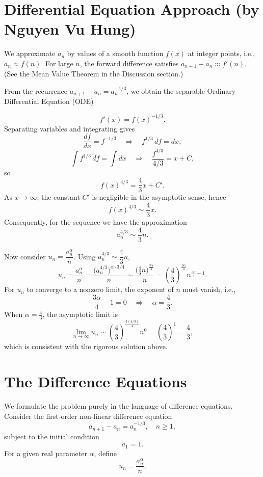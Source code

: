 \documentclass{article}
\begin{document}
\section{Differential Equation Approach (by Nguyen Vu Hung)}
We approximate $a_n$ by values of a smooth function $f(x)$ at 
integer points, i.e., $a_n \approx f(n)$. 
For large $n$, the forward difference satisfies $a_{n+1} - a_n \approx f'(n)$.
(See the Mean Value Theorem in the Discussion section.)


From the recurrence $a_{n+1} - a_n = a_n^{-1/3}$, we obtain the separable Ordinary Differential Equation (ODE)

$$ f'(x) = f(x)^{-1/3}. $$
Separating variables and integrating gives
$$ \frac{df}{dx} = f^{-1/3} \quad \Rightarrow \quad f^{1/3}\, df = dx, $$
$$ \int f^{1/3}\, df = \int dx \quad \Rightarrow \quad \frac{f^{4/3}}{4/3} = x + C, $$
so
$$ f(x)^{4/3} = \frac{4}{3}x + C'. $$
As $x \to \infty$, the constant $C'$ is negligible in the asymptotic sense, hence
$$ f(x)^{4/3} \sim \frac{4}{3}x. $$
Consequently, for the sequence we have the approximation
$$ a_n^{4/3} \sim \frac{4}{3}n. $$

Now consider $u_n = \dfrac{a_n^{\alpha}}{n}$. Using $a_n^{4/3} \sim \dfrac{4}{3}n$,
$$ u_n = \frac{a_n^{\alpha}}{n} = \frac{\big(a_n^{4/3}\big)^{\alpha\cdot 3/4}}{n}
\sim \frac{\big(\tfrac{4}{3}n\big)^{\frac{3\alpha}{4}}}{n}
= \left(\frac{4}{3}\right)^{\frac{3\alpha}{4}} n^{\frac{3\alpha}{4}-1}. $$
For $u_n$ to converge to a nonzero limit, the exponent of $n$ must vanish, i.e.,
$$ \frac{3\alpha}{4} - 1 = 0 \quad \Longrightarrow \quad \alpha = \frac{4}{3}. $$
When $\alpha = \tfrac{4}{3}$, the asymptotic limit is
$$ \lim_{n\to\infty} u_n \sim \left(\frac{4}{3}\right)^{\frac{3(4/3)}{4}} n^{0} = \left(\frac{4}{3}\right)^{1} = \frac{4}{3}, $$
which is consistent with the rigorous solution above.

\section{The Difference Equations}
We formulate the problem purely in the language of difference equations. 
Consider the first-order non-linear difference equation
$$ a_{n+1} - a_n = a_n^{-1/3}, \quad n \ge 1, $$
subject to the initial condition
$$ a_1 = 1. $$
For a given real parameter $\alpha$, define
$$ u_n = \frac{a_n^\alpha}{n}. $$
\end{document}
